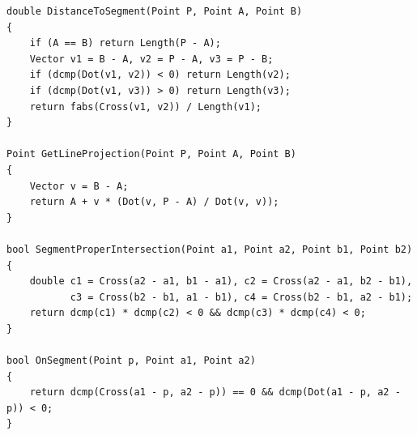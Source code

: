 \documentclass[twoside]{article}
\begin{document}
\begin{lstlisting}
double DistanceToSegment(Point P, Point A, Point B)
{
    if (A == B) return Length(P - A);
    Vector v1 = B - A, v2 = P - A, v3 = P - B;
    if (dcmp(Dot(v1, v2)) < 0) return Length(v2);
    if (dcmp(Dot(v1, v3)) > 0) return Length(v3);
    return fabs(Cross(v1, v2)) / Length(v1);
}

Point GetLineProjection(Point P, Point A, Point B)
{
    Vector v = B - A;
    return A + v * (Dot(v, P - A) / Dot(v, v));
}

bool SegmentProperIntersection(Point a1, Point a2, Point b1, Point b2)
{
    double c1 = Cross(a2 - a1, b1 - a1), c2 = Cross(a2 - a1, b2 - b1),
           c3 = Cross(b2 - b1, a1 - b1), c4 = Cross(b2 - b1, a2 - b1);
    return dcmp(c1) * dcmp(c2) < 0 && dcmp(c3) * dcmp(c4) < 0;
}

bool OnSegment(Point p, Point a1, Point a2)
{
    return dcmp(Cross(a1 - p, a2 - p)) == 0 && dcmp(Dot(a1 - p, a2 - p)) < 0;
}\end{lstlisting}
\end{document}
